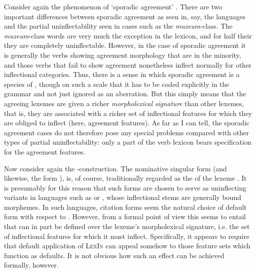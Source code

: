 \documentclass[output=paper,colorlinks,citecolor=brown]{langscibook}
\begin{document}
Consider again the phenomenon of  `sporadic agreement' \citep{fedden2019}. %
There are two important differences between sporadic agreement as seen in, say, the  languages and the partial uninflectability seen in  cases such as the  \textit{muzeum}-class. The \textit{muzeum}-class words are very much the exception in the  lexicon, and for half their  they are completely uninflectable. However, in the case of sporadic agreement it is generally the verbs showing agreement morphology that are in the minority, and those verbs that fail to show agreement nonetheless inflect normally for other inflectional categories. Thus, there is a sense in which sporadic agreement is a species of , though on such a scale that it has to be coded explicitly in the grammar and not just ignored as an aberration. But this simply means that the agreeing lexemes are given a richer \textit{morpholexical signature} than other lexemes, that is, they are associated with a richer set of inflectional features for which they are obliged to inflect (here, agreement features). As far as I can tell, the sporadic agreement cases do not therefore pose any special problems compared with other types of partial uninflectability:  only a part of the verb lexicon bears specification for the agreement features. 

Now consider again the  -construction. The  nominative singular form  (and likewise, the form  ), is, of course, traditionally regarded as the   of the lexeme . It is presumably for this reason that such forms are chosen to serve as  uninflecting variants in languages such as  or , whose inflectional stems are generally bound morphemes. In such languages, citation forms seem the natural choice of default form with respect to . However, from a formal point of view this seems to entail that  can in part be defined over the lexeme's morpholexical signature, i.e. the set of inflectional features for which it must inflect. Specifically, it appears to require that default application of \textsc{LexIn} can appeal somehow to those feature sets which function as defaults. It is not obvious how such an effect can be achieved formally, however.
\end{document}
